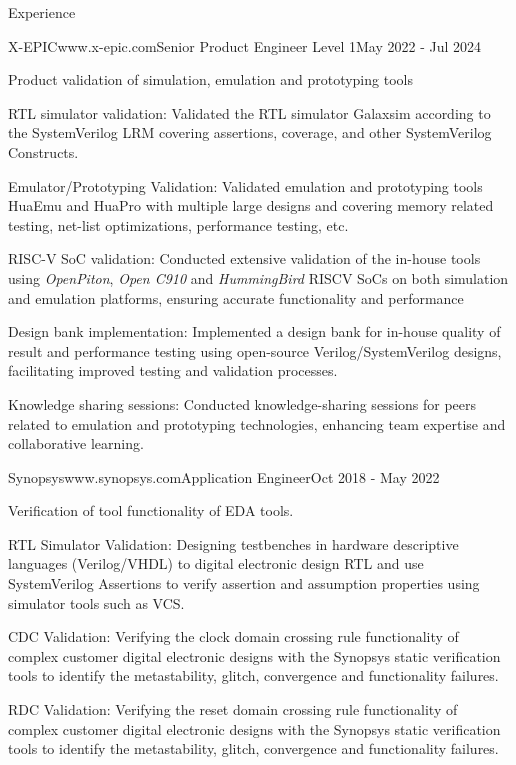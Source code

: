 \documentclass[
11pt, %
]{./assets/resume} %
\begin{document}
\begin{rSection}{Experience}
	\begin{rSubsectionX}{X-EPIC}{www.x-epic.com}{Senior Product Engineer Level 1}{May 2022 - Jul 2024}
		\item Product validation of simulation, emulation and prototyping tools 
		\item RTL simulator validation: Validated the RTL simulator Galaxsim according to the SystemVerilog LRM covering assertions, coverage, and other SystemVerilog Constructs. 
		\item Emulator/Prototyping Validation: Validated emulation and prototyping tools HuaEmu and HuaPro with multiple large designs and covering memory related testing, net-list optimizations, performance testing, etc. 
		\item RISC-V SoC validation: Conducted extensive validation of the in-house tools using \textit{OpenPiton}, \textit{Open C910} and \textit{HummingBird} RISCV SoCs on both simulation and emulation platforms, ensuring accurate functionality and performance 
		\item Design bank implementation: Implemented a design bank for in-house quality of result and performance testing using open-source Verilog/SystemVerilog designs, facilitating improved testing and validation processes. 
		\item Knowledge sharing sessions: Conducted knowledge-sharing sessions for peers related to emulation and prototyping technologies, enhancing team expertise and collaborative learning.
	\end{rSubsectionX}
	\begin{rSubsectionX}{Synopsys}{www.synopsys.com}{Application Engineer}{Oct 2018 - May 2022}
		\item Verification of tool functionality of EDA tools.
		\item RTL Simulator Validation: Designing testbenches in hardware descriptive languages (Verilog/VHDL) to digital electronic design RTL and use SystemVerilog Assertions to verify assertion and assumption properties using simulator tools such as VCS. 
		\item CDC Validation: Verifying the clock domain crossing rule functionality of complex customer digital electronic designs with the Synopsys static verification tools to identify the metastability, glitch, convergence and functionality failures. 
		\item RDC Validation: Verifying the reset domain crossing rule functionality of complex customer digital electronic designs with the Synopsys static verification tools to identify the metastability, glitch, convergence and functionality failures. 

\end{rSubsectionX}
\end{rSection}
\end{document}
